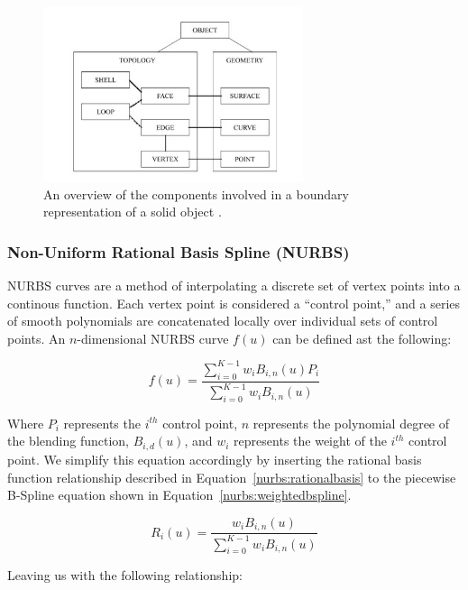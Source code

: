 \documentclass[12pt]{drexelthesis}
\let\Oldsubsubsection\subsubsection
\renewcommand{\subsubsection}{\FloatBarrier\Oldsubsubsection}
\begin{document}
\begin{figure}[!ht]
	\centering
		\includegraphics[width=3in]{cadTypes/brep.jpg}
	\caption[Components of a boundary representation.]{\centering An overview of the components involved in a boundary representation of a solid object \cite{Stroud2006}.}
\end{figure}

\subsubsection{Non-Uniform Rational Basis Spline (NURBS)}
NURBS curves are a method of interpolating a discrete set of vertex points into a continous function. Each vertex point is considered a ``control point,'' and a series of smooth polynomials are concatenated locally over individual sets of control points. An $n$-dimensional NURBS curve $f(u)$ can be defined ast the following:

\begin{equation}
	f(u) = \frac    {   \sum_{i=0}^{K-1} w_{i} B_{i,n}(u) P_{i} }
				 	{  \sum_{i=0}^{K-1} w_{i} B_{i,n}(u) }
	\label{nurbs:weightedbspline}
 \end{equation}
 
 Where $P_{i}$ represents the $i^{th}$ control point, $n$ represents the polynomial degree of the blending function, $B_{i,d}(u)$, and $w_{i}$ represents the weight of the $i^{th}$ control point. We simplify this equation accordingly by inserting the rational basis function relationship described in Equation~\ref{nurbs:rationalbasis} to the piecewise B-Spline equation shown in Equation~\ref{nurbs:weightedbspline}.
 
\begin{equation}
	R_{i}(u) = \frac    {   w_{i} B_{i,n}(u)}
				 		{  \sum_{i=0}^{K-1} w_{i} B_{i,n}(u) }
	\label{nurbs:rationalbasis}
 \end{equation}
 
 Leaving us with the following relationship:
 
\end{document}
